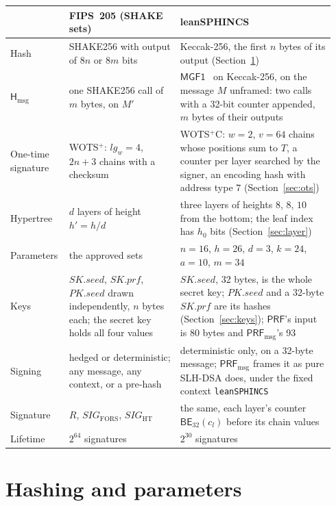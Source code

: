 \documentclass[11pt]{article}
\newcommand{\PRF}{\mathsf{PRF}}
\newcommand{\PRFmsg}{\mathsf{PRF}_{\mathrm{msg}}}
\newcommand{\Hmsg}{\mathsf{H}_{\mathrm{msg}}}
\newcommand{\BE}{\mathsf{BE}}
\newcommand{\pkseed}{\mathit{PK.seed}}
\newcommand{\skseed}{\mathit{SK.seed}}
\newcommand{\skprf}{\mathit{SK.prf}}
\begin{document}
\begin{table}[ht]
\centering
\small
\renewcommand{\arraystretch}{1.15}
\begin{tabular}{@{}>{\raggedright}p{0.15\linewidth}>{\raggedright}p{0.33\linewidth}>{\raggedright\arraybackslash}p{0.46\linewidth}@{}}
\toprule
& FIPS~205 (SHAKE sets) & leanSPHINCS\\
\midrule
Hash & SHAKE256 with output of $8n$ or $8m$ bits & Keccak-256, the first $n$ bytes of its output (Section~\ref{sec:parameters})\\
$\Hmsg$ & one SHAKE256 call of $m$ bytes, on $M'$ & $\mathsf{MGF1}$~\cite{RFC8017} on Keccak-256, on the message $M$ unframed: two calls with a 32-bit counter appended, $m$ bytes of their outputs\\
One-time signature & WOTS$^+$: $\mathit{lg}_w=4$, $2n+3$ chains with a checksum & WOTS$^+$C: $w=2$, $v=64$ chains whose positions sum to $T$, a counter per layer searched by the signer, an encoding hash with address type $7$ (Section~\ref{sec:ots})\\
Hypertree & $d$ layers of height $h'=h/d$ & three layers of heights $8$, $8$, $10$ from the bottom; the leaf index has $h_0$ bits (Section~\ref{sec:layer})\\
Parameters & the approved sets & $n=16$, $h=26$, $d=3$, $k=24$, $a=10$, $m=34$\\
Keys & $\skseed$, $\skprf$, $\pkseed$ drawn independently, $n$ bytes each; the secret key holds all four values & $\skseed$, 32 bytes, is the whole secret key; $\pkseed$ and a 32-byte $\skprf$ are its hashes (Section~\ref{sec:keys}); $\PRF$'s input is 80 bytes and $\PRFmsg$'s 93\\
Signing & hedged or deterministic; any message, any context, or a pre-hash & deterministic only, on a 32-byte message; $\PRFmsg$ frames it as pure SLH-DSA does, under the fixed context \texttt{leanSPHINCS}\\
Signature & $R$, $\mathit{SIG}_{\mathrm{FORS}}$, $\mathit{SIG}_{\mathrm{HT}}$ & the same, each layer's counter $\BE_{32}(c_l)$ before its chain values\\
Lifetime & $2^{64}$ signatures & $2^{30}$ signatures\\
\bottomrule
\end{tabular}
\end{table}

\section{Hashing and parameters}
\label{sec:parameters}
\end{document}
